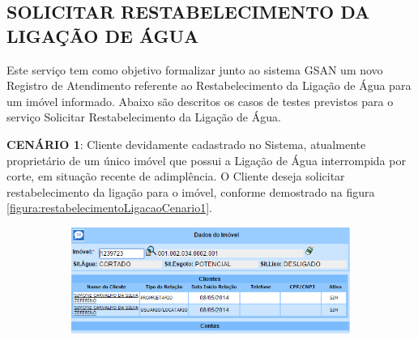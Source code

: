 \subsection{\textbf{\uppercase{Solicitar Restabelecimento da Ligação de Água}}}
Este serviço tem como objetivo formalizar junto ao sistema GSAN um novo Registro de Atendimento referente ao Restabelecimento da Ligação de Água para um imóvel informado.
Abaixo são descritos os casos de testes previstos para o serviço Solicitar Restabelecimento da Ligação de Água.
\begin{flushleft}
	\begin{description}
		\item \textbf{CENÁRIO 1}: Cliente devidamente cadastrado no Sistema, atualmente proprietário de um único imóvel que possui a Ligação de Água interrompida por corte, em situação recente de adimplência. O Cliente deseja solicitar restabelecimento da ligação para o imóvel, conforme demostrado na figura \ref{figura:restabelecimentoLigacaoCenario1}.
		\begin{figure}[H]
			\centering
			\caption{Restabelecimento da Ligação de Água - Cenário de Teste 1}
			\label{figura:restabelecimentoLigacaoCenario1}
			\begin{subfigure}[H]{\textwidth}
				\centering
				\includegraphics{figuras/cenarios/restabelecimento/cenario_1.PNG}
			\end{subfigure}
		\end{figure}
	\end{description}
	

\end{flushleft}

